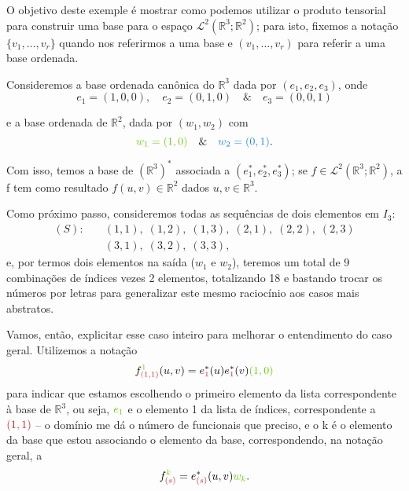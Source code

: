 \documentclass[../differential_forms.tex]{subfiles}
\begin{document}
\begin{example}
	O objetivo deste exemple é mostrar como podemos utilizar o produto tensorial para construir uma base para o espaço \(\mathcal{L}^{2}(\mathbb{R}^{3}; \mathbb{R}^{2})\); para isto, fixemos a notação \(\{v_1, \dotsc , v_r\}\) quando nos referirmos a uma base e \((v_1, \dotsc , v_r)\) para referir a uma base ordenada.

	Consideremos a base ordenada canônica do \(\mathbb{R}^{3}\) dada por \((e_1, e_2, e_3)\), onde
	\[
		e_1 = (1, 0, 0),\quad e_2 = (0, 1, 0) \quad\&\quad e_3 = (0, 0, 1)
	\]

	e a base ordenada de \(\mathbb{R}^{2}\), dada por \((w_1, w_2)\) com
	\[
		{\color{Chartreuse3}w_1 = (1, 0)} \quad\&\quad {\color{DodgerBlue2}w_2 = (0, 1)}.
	\]

	Com isso, temos a base de \((\mathbb{R}^{3})^{*}\) associada a \((e_1^{*}, e_2^{*}, e_3^{*})\); se \(f\in \mathcal{L}^{2}(\mathbb{R}^{3}; \mathbb{R}^{2})\), a f tem como resultado \(f(u, v)\in \mathbb{R}^{2}\) dados \(u, v\in \mathbb{R}^{3}\).

	Como próximo passo, consideremos todas as sequências de dois elementos em \(I_3\):
	\begin{align*}
		(S):\quad & (1, 1),\; (1, 2),\; (1, 3),\; (2, 1),\; (2, 2),\; (2, 3) \\
		          & (3, 1),\; (3, 2),\; (3, 3),
	\end{align*}
	e, por termos dois elementos na saída (\(w_1\) e \(w_2\)), teremos um total de 9 combinações de índices vezes 2 elementos, totalizando 18 e bastando trocar os números por letras para generalizar este mesmo raciocínio aos casos mais abstratos.

	Vamos, então, explicitar esse caso inteiro para melhorar o entendimento do caso geral. Utilizemos a notação
	\[
		f_{{\color{Firebrick3}(1, 1)}}^{{\color{Chartreuse3}1}}(u, v) = e_{{\color{Firebrick3}1}}^{*}(u)e_{{\color{Firebrick3}1}}^{*}(v){\color{Chartreuse3}(1, 0)}
	\]
	para indicar que estamos escolhendo o {\color{Chartreuse3}primeiro elemento da lista correspondente à base de \(\mathbb{R}^{3}\)}, ou seja, \({\color{Chartreuse3}e_1}\) e o {\color{Firebrick3}elemento 1 da lista de índices}, correspondente a \({\color{Firebrick3}(1, 1)}\) -- o domínio me dá o número de funcionais que preciso, e o k é o elemento da base que estou associando o elemento da base, correspondendo, na notação geral, a
	\[
		f_{{\color{Firebrick3}(s)}}^{{\color{Chartreuse3}k}} = e_{{\color{Firebrick3}(s)}}^{*}(u, v){\color{Chartreuse3}w_k}.
	\]


\end{example}
\end{document}
